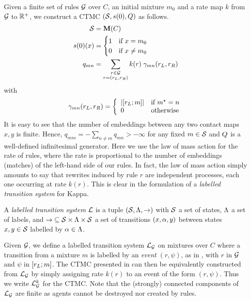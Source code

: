 Given a finite set of rules $\mathcal{G}$ over $C$,
an initial mixture $m_0$
and a rate map $k$ from $\mathcal{G}$ to $\mathbb{R}^+$,
we construct a CTMC $\left(\mathcal{S}, s(0), Q\right)$ as follows.
\begin{align}
  \label{eq:kappa-ctmc}
  \mathcal{S} &= \mathbf{M}(C) \nonumber \\
  s(0)(x) &= \begin{cases}
    1 \quad\text{if } x = m_0 \\
    0 \quad\text{if } x \neq m_0
  \end{cases} \\
  q_{mn} &= \sum_{\substack{r \in \mathcal{G}\\r = \left(r_L,r_R\right)}}
    k(r) \; \gamma_{mn}(r_L,r_R) \nonumber
\end{align}
with
\begin{equation*}
  \gamma_{mn}(r_L,r_R) = \left\{\begin{array}{ll}
    \left\lvert \left[r_L;m\right] \right\rvert & \text{if } m^\star = n \\
    0 & \text{otherwise}
  \end{array}\right.
\end{equation*}
It is easy to see that the number of embeddings
between any two contact maps $x,y$ is finite.
Hence, $q_{mm} = -\sum_{n \neq m} q_{mn} > -\infty$
for any fixed $m \in \mathcal{S}$
and $Q$ is a well-defined infinitesimal generator.
Here we use the law of mass action for the rate of rules,
where the rate is proportional to the number of embeddings (matches)
of the left-hand side of our rules.
In fact, the law of mass action simply amounts to say that
rewrites induced by rule $r$ are independent processes,
each one occurring at rate $k(r)$.
This is clear in the formulation of
a \emph{labelled transition system} for Kappa.

\begin{definition}
  A \emph{labelled transition system} $\mathcal{L}$ is a tuple
  $\left(\mathcal{S},\Lambda,\to\right)$ with
  $\mathcal{S}$ a set of states,
  $\Lambda$ a set of labels,
  and $\to\; \subseteq \mathcal{S} \times \Lambda \times \mathcal{S}$
  a set of transitions $\left(x,\alpha,y\right)$
  between states $x,y \in \mathcal{S}$
  labelled by $\alpha \in \Lambda$.
\end{definition}

Given $\mathcal{G}$,
we define a labelled transition system $\mathcal{L}_{\mathcal{G}}$
on mixtures over $C$ where
a transition from a mixture $m$ is labelled by
an \emph{event} $(r,\psi)$, as in ,
with $r$ in $\mathcal{G}$ and $\psi$ in $\left[r_L;m\right]$.
The CTMC presented in  can then be equivalently
constructed from $\mathcal{L}_{\mathcal{G}}$ by simply assigning
rate $k(r)$ to an event of the form $(r,\psi)$.
Thus we write $\mathcal{L}^k_{\mathcal{G}}$ for the CTMC.
Note that the (strongly) connected components of $\mathcal{L}_{\mathcal{G}}$
are finite as agents cannot be destroyed nor created by rules.

